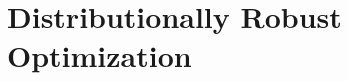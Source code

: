 \documentclass[11pt,reqno,letter]{amsart}
\theoremstyle{plain}
\theoremstyle{definition}
\numberwithin{equation}{section}
\numberwithin{theorem}{section}
\numberwithin{table}{section}
\numberwithin{figure}{section}
\begin{document}



\section{Distributionally Robust Optimization}
\label{sec:DRO}
\end{document}
